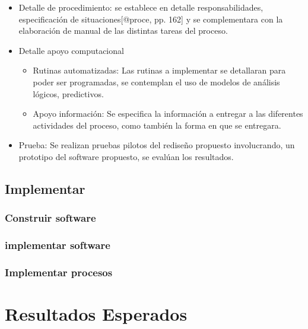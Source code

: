 \documentclass[11pt]{article}
\providecommand{\tightlist}{%
      \setlength{\itemsep}{0pt}\setlength{\parskip}{0pt}}
\begin{document}
\begin{itemize}
\tightlist
\item
  Detalle de procedimiento: se establece en detalle responsabilidades,
  especificación de situaciones{[}@proce, pp. 162{]} y se complementara
  con la elaboración de manual de las distintas tareas del proceso.
\item
  Detalle apoyo computacional

  \begin{itemize}
  \tightlist
  \item
    Rutinas automatizadas: Las rutinas a implementar se detallaran para
    poder ser programadas, se contemplan el uso de modelos de análisis
    lógicos, predictivos.
  \item
    Apoyo información: Se especifica la información a entregar a las
    diferentes actividades del proceso, como también la forma en que se
    entregara.
  \end{itemize}
\item
  Prueba: Se realizan pruebas pilotos del rediseño propuesto
  involucrando, un prototipo del software propuesto, se evalúan los
  resultados.
\end{itemize}

\hypertarget{implementar}{%
\subsection{Implementar}\label{implementar}}

\hypertarget{construir-software}{%
\subsubsection{Construir software}\label{construir-software}}

\hypertarget{implementar-software}{%
\subsubsection{implementar software}\label{implementar-software}}

\hypertarget{implementar-procesos}{%
\subsubsection{Implementar procesos}\label{implementar-procesos}}

\hypertarget{resultados-esperados}{%
\section{Resultados Esperados}\label{resultados-esperados}}
\end{document}
